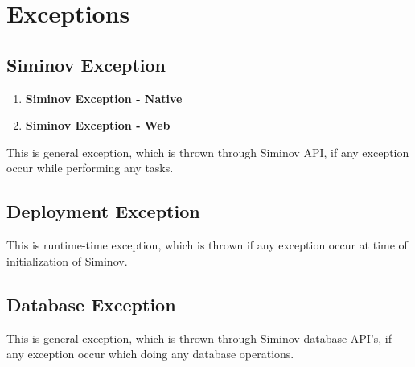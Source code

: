 \newpage
\chapter {\Large{Exceptions}}

\section{Siminov Exception}

	\begin{enumerate}

		\item \small \textbf{Siminov Exception - Native}
			

		\item \small \textbf{Siminov Exception - Web}
			

	\end{enumerate}


\par
This is general exception, which is thrown through Siminov API, if any exception occur while performing any tasks.

\section{Deployment Exception}
	

\par
This is runtime-time exception, which is thrown if any exception occur at time of initialization of Siminov.

\section{Database Exception}
	

\par
This is general exception, which is thrown through Siminov database API's, if any exception occur which doing any database operations.